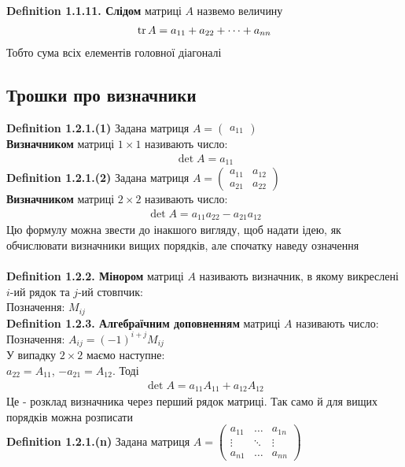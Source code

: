 \documentclass[a4paper, 10pt]{article}
\def\defin#1{\textbf{Definition {#1}}}
\theoremstyle{theoremdd}
\theoremstyle{theoremdd}
\theoremstyle{theoremdd}
\theoremstyle{theoremdd}
\theoremstyle{theoremdd}
\theoremstyle{theoremdd}
\theoremstyle{theoremdd}
\theoremstyle{theoremdd}
\begin{document}
  \bigskip \\
  \defin{1.1.11. Слідом} матриці $A$ назвемо величину
  \begin{align*}
  \tr A = a_{11} + a_{22} + \dots + a_{nn}
  \end{align*}
  Тобто сума всіх елементів головної діагоналі\\
  	\subsection{Трошки про визначники}
	\defin{1.2.1.(1)} Задана матриця $A = \begin{pmatrix} a_{11} \end{pmatrix}$\\
	\textbf{Визначником} матриці $1 \times 1$ називають число:
	\begin{align*}
	\det A = a_{11}
	\end{align*}
	\defin{1.2.1.(2)} Задана матриця $A = \begin{pmatrix}
	a_{11} & a_{12} \\
	a_{21} & a_{22}
	\end{pmatrix}$\\
	\textbf{Визначником} матриці $2 \times 2$ називають число:
	\begin{align*}
	\det A = a_{11}a_{22} - a_{21}a_{12}
	\end{align*}
	Цю формулу можна звести до інакшого вигляду, щоб надати ідею, як обчислювати визначники вищих порядків, але спочатку наведу означення\\
	\bigskip \\
	\defin{1.2.2. Мінором} матриці $A$ називають визначник, в якому викреслені $i$-ий рядок та $j$-ий стовпчик:\\
	Позначення: $M_{ij}$\bigskip \\
	\defin{1.2.3. Алгебраїчним доповненням} матриці $A$ називають число:\\
	Позначення: $A_{ij} = (-1)^{i+j} M_{ij}$\bigskip \\
	У випадку $2 \times 2$ маємо наступне: \\
	$a_{22} = A_{11}$, $-a_{21} = A_{12}$. Тоді
	\begin{align*}
	\det A = a_{11}A_{11} + a_{12}A_{12}
	\end{align*}
	Це - розклад визначника через перший рядок матриці. Так само й для вищих порядків можна розписати\\
	\defin{1.2.1.(n)} Задана матриця $A = \begin{pmatrix}
	a_{11} & \dots & a_{1n} \\
	\vdots & \ddots & \vdots \\
	a_{n1} & \dots & a_{nn}
	\end{pmatrix}$\\
\end{document}
